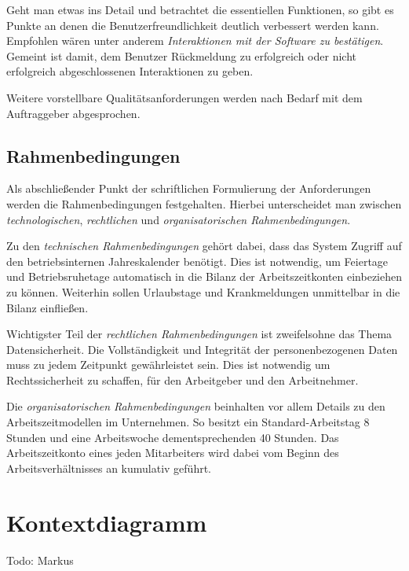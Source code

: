 Geht man etwas ins Detail und betrachtet die essentiellen Funktionen, so gibt es Punkte an denen die Benutzerfreundlichkeit deutlich verbessert werden kann. Empfohlen w\"aren unter anderem \textit{Interaktionen mit der Software zu best\"atigen}. Gemeint ist damit, dem Benutzer R\"uckmeldung zu erfolgreich oder nicht erfolgreich abgeschlossenen Interaktionen zu geben. \newline

Weitere vorstellbare Qualit\"atsanforderungen werden nach Bedarf mit dem Auftraggeber abgesprochen.

\newpage
\section{Rahmenbedingungen}
Als abschlie{\ss}ender Punkt der schriftlichen Formulierung der Anforderungen werden die Rahmenbedingungen festgehalten. Hierbei unterscheidet man zwischen \textit{technologischen}, \textit{rechtlichen} und \textit{organisatorischen Rahmenbedingungen}. \newline

Zu den \textit{technischen Rahmenbedingungen} geh\"ort dabei, dass das System Zugriff auf den betriebsinternen Jahreskalender ben\"otigt. Dies ist notwendig, um Feiertage und Betriebsruhetage automatisch in die Bilanz der Arbeitszeit\-konten einbeziehen zu k\"onnen. Weiterhin sollen Urlaubstage und Krankmeldungen unmittelbar in die Bilanz einflie{\ss}en.  \newline

Wichtigster Teil der \textit{rechtlichen Rahmenbedingungen} ist zweifelsohne das Thema Datensicherheit. Die Vollst\"andigkeit und Integrit\"at der personenbezogenen Daten muss zu jedem Zeitpunkt gew\"ahrleistet sein. Dies ist notwendig um Rechtssicherheit zu schaffen, f\"ur den Arbeitgeber und den Arbeitnehmer.  \newline

Die \textit{organisatorischen Rahmenbedingungen} beinhalten vor allem Details zu den Arbeitszeitmodellen im Unternehmen. So besitzt ein Standard-Arbeitstag 8 Stunden und eine Arbeitswoche dementsprechenden 40 Stunden. Das Arbeitszeitkonto eines jeden Mitarbeiters wird dabei vom Beginn des Arbeitsverh\"altnisses an kumulativ gef\"uhrt.  

\newpage

\chapter{Kontextdiagramm}
Todo: Markus
